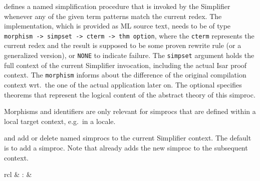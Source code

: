 \begin{isabellebody}
\begin{isamarkuptext}
  \begin{description}

  \item \hyperlink{command.simproc-setup}{\mbox{}} defines a named simplification
  procedure that is invoked by the Simplifier whenever any of the
  given term patterns match the current redex.  The implementation,
  which is provided as ML source text, needs to be of type \verb|morphism -> simpset -> cterm -> thm option|, where the \verb|cterm| represents the current redex  and the result is
  supposed to be some proven rewrite rule  (or a
  generalized version), or \verb|NONE| to indicate failure.  The
  \verb|simpset| argument holds the full context of the current
  Simplifier invocation, including the actual Isar proof context.  The
  \verb|morphism| informs about the difference of the original
  compilation context wrt.\ the one of the actual application later
  on.  The optional \hyperlink{keyword.identifier}{\mbox{}} specifies theorems that
  represent the logical content of the abstract theory of this
  simproc.

  Morphisms and identifiers are only relevant for simprocs that are
  defined within a local target context, e.g.\ in a locale.

  \item {} and 
  add or delete named simprocs to the current Simplifier context.  The
  default is to add a simproc.  Note that \hyperlink{command.simproc-setup}{\mbox{}}
  already adds the new simproc to the subsequent context.

  \end{description}%
\end{isamarkuptext}%
\isamarkuptrue%
%
\isamarkuptrue%
%
\begin{isamarkuptext}%
\begin{matharray}{rcl}
    \hypertarget{attribute.simplified}{\hyperlink{attribute.simplified}{\mbox{}}} & : &  \\
  \end{matharray}


\end{isamarkuptext}
\end{isabellebody}
